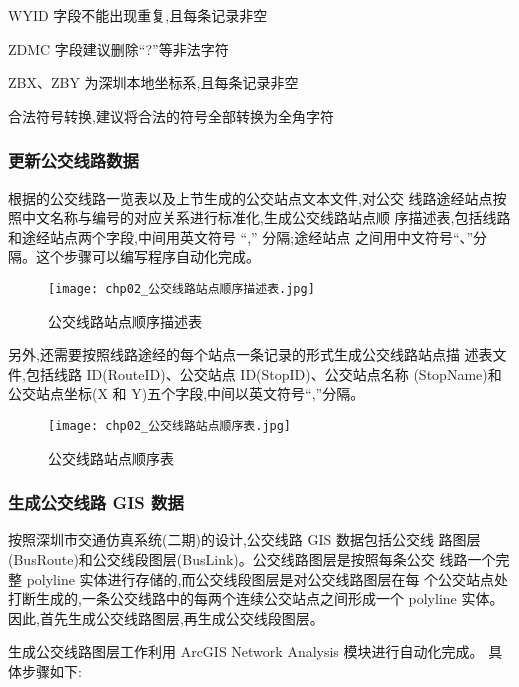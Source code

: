 \begin{cit}
\item WYID 字段不能出现重复,且每条记录非空
\item ZDMC 字段建议删除“?”等非法字符
\item ZBX、ZBY 为深圳本地坐标系,且每条记录非空
\item 合法符号转换,建议将合法的符号全部转换为全角字符
\end{cit}

\subsubsection{更新公交线路数据} \label{subsubsec:更新公交线路数据}
根据的公交线路一览表以及上节生成的公交站点文本文件,对公交
线路途经站点按照中文名称与编号的对应关系进行标准化,生成公交线路站点顺
序描述表,包括线路和途经站点两个字段,中间用英文符号 “,” 分隔;途经站点
之间用中文符号“、”分隔。这个步骤可以编写程序自动化完成。

\begin{figure}[ht]
  \centering
  \texttt{[image: chp02\_公交线路站点顺序描述表.jpg]}
  \caption{公交线路站点顺序描述表\label{fig:公交线路站点顺序描述表} }
\end{figure}

另外,还需要按照线路途经的每个站点一条记录的形式生成公交线路站点描
述表文件,包括线路 ID(RouteID)、公交站点 ID(StopID)、公交站点名称
(StopName)和公交站点坐标(X 和 Y)五个字段,中间以英文符号“,”分隔。

\begin{figure}[ht]
  \centering
  \texttt{[image: chp02\_公交线路站点顺序表.jpg]}
  \caption{公交线路站点顺序表\label{fig:公交线路站点顺序表} }
\end{figure}

\subsubsection{生成公交线路 GIS 数据}
按照深圳市交通仿真系统(二期)的设计,公交线路 GIS 数据包括公交线
路图层(BusRoute)和公交线段图层(BusLink)。公交线路图层是按照每条公交
线路一个完整 polyline 实体进行存储的,而公交线段图层是对公交线路图层在每
个公交站点处打断生成的,一条公交线路中的每两个连续公交站点之间形成一个
polyline 实体。因此,首先生成公交线路图层,再生成公交线段图层。

生成公交线路图层工作利用 ArcGIS Network Analysis 模块进行自动化完成。
具体步骤如下:

